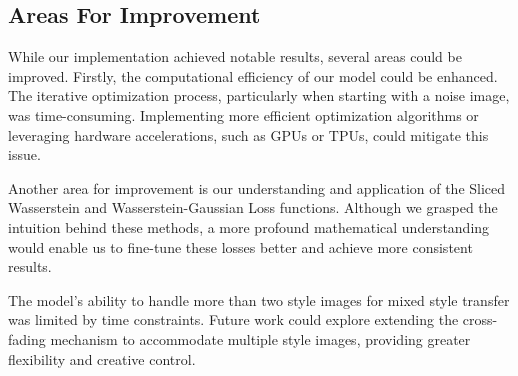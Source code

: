 \documentclass[12pt]{article}
\begin{document}
\subsection{Areas For Improvement}
While our implementation achieved notable results, several areas could be
improved. Firstly, the computational efficiency of our model could be enhanced.
The iterative optimization process, particularly when starting with a noise
image, was time-consuming. Implementing more efficient optimization algorithms
or leveraging hardware accelerations, such as GPUs or TPUs, could mitigate this
issue.

Another area for improvement is our understanding and application of the Sliced
Wasserstein and Wasserstein-Gaussian Loss functions. Although we grasped the
intuition behind these methods, a more profound mathematical understanding would
enable us to fine-tune these losses better and achieve more consistent results.

The model's ability to handle more than two style images for mixed style
transfer was limited by time constraints. Future work could explore extending
the cross-fading mechanism to accommodate multiple style images, providing
greater flexibility and creative control.
\end{document}
